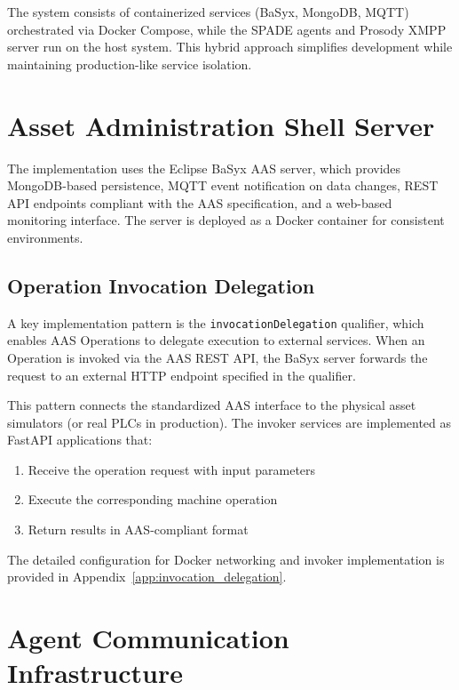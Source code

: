The system consists of containerized services (BaSyx, MongoDB, MQTT) orchestrated via Docker Compose, while the SPADE agents and Prosody \ac{XMPP} server run on the host system. This hybrid approach simplifies development while maintaining production-like service isolation.

\section{Asset Administration Shell Server}
\label{sec:aas_server}

The implementation uses the Eclipse BaSyx \ac{AAS} server, which provides MongoDB-based persistence, MQTT event notification on data changes, REST API endpoints compliant with the \ac{AAS} specification, and a web-based monitoring interface. The server is deployed as a Docker container for consistent environments.

\subsection{Operation Invocation Delegation}
\label{subsec:invocation_delegation}

A key implementation pattern is the \texttt{invocationDelegation} qualifier, which enables \ac{AAS} Operations to delegate execution to external services. When an Operation is invoked via the \ac{AAS} REST API, the BaSyx server forwards the request to an external HTTP endpoint specified in the qualifier.

This pattern connects the standardized \ac{AAS} interface to the physical asset simulators (or real PLCs in production). The invoker services are implemented as FastAPI applications that:
\begin{enumerate}
    \item Receive the operation request with input parameters
    \item Execute the corresponding machine operation
    \item Return results in \ac{AAS}-compliant format
\end{enumerate}

The detailed configuration for Docker networking and invoker implementation is provided in Appendix~\ref{app:invocation_delegation}.

\section{Agent Communication Infrastructure}
\label{sec:xmpp_config}

